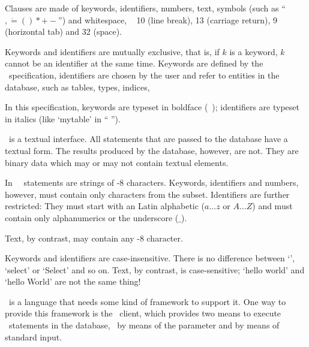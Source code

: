 Clauses are made of keywords, identifiers, numbers, text,
symbols (such as ``$, \dot = ( ) * + -$'') and
whitespace, \ie\ 
10 (line break),
13 (carriage return),
9  (horizontal tab)
and 32 (space).

Keywords and identifiers are mutually
exclusive, that is, if $k$ is a keyword,
$k$ cannot be an identifier at the same time.
Keywords are defined by the \sql\ specification,
identifiers are chosen by the user
and refer to entities in the database,
such as tables, types, indices, \etc\

In this specification,
keywords are typeset in boldface
(\eg\ );
identifiers are typeset in italics
(like `mytable' in 
`` '').

\sql\ is a textual interface.
All statements that are passed to the database
have a textual form. The results produced
by the database, however, are not. They are
binary data which may or may not
contain textual elements.

In \nowdb\ \sql\ statements are strings
of -8 characters.
Keywords, identifiers and numbers, however,
must contain only characters
from the  subset.
Identifiers are further restricted:
They must start with an  
Latin alphabetic ($a\dots z$ or $A \dots Z$)
and must contain only
alphanumerics or the underscore ($\_$).

Text, by contrast, may contain any
-8 character.

Keywords and identifiers are case-insensitive.
There is no difference between
`', `select' or `Select'
and so on.
Text, by contrast, is case-sensitive;
`hello world' and `hello World'
are not the same thing!

\sql\ is a  language
that needs some kind of framework
to support it. One way to provide this
framework is the \nowdb\ client,
which provides two means to execute
\sql\ statements in the database,
\ie\ by means of the  parameter
and by means of standard input.

